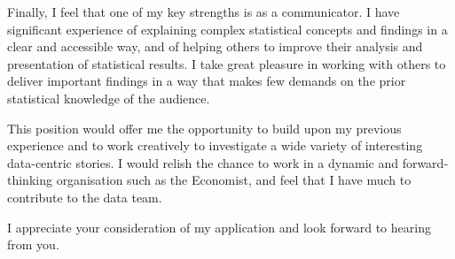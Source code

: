\documentclass[11pt,a4paper,sans]{moderncv}        %
\begin{document}
Finally, I feel that one of my key strengths is as a communicator. I have significant experience of explaining complex statistical concepts and findings in a clear and accessible way, and of helping others to improve their analysis and presentation of statistical results. I take great pleasure in working with others to deliver important findings in a way that makes few demands on the prior statistical knowledge of the audience. 

This position would offer me the opportunity to build upon my previous experience and to work creatively to investigate a wide variety of interesting data-centric stories. I would relish the chance to work in a dynamic and forward-thinking organisation such as the Economist, and feel that I have much to contribute to the data team.

I appreciate your consideration of my application and look forward to hearing from you.



\makeletterclosing

\end{document}
